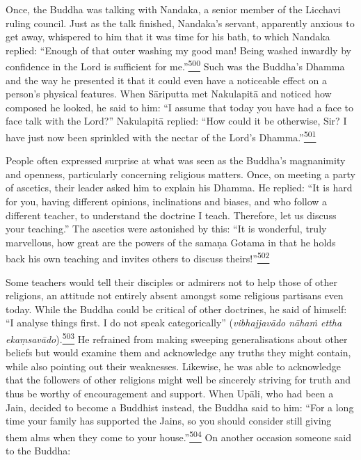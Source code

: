 Once, the Buddha was talking with Nandaka, a senior member of the
Licchavi ruling council. Just as the talk finished, Nandaka's servant,
apparently anxious to get away, whispered to him that it was time for
his bath, to which Nandaka replied: ``Enough of that outer washing my
good man! Being washed inwardly by confidence in the Lord is sufficient
for
me.''\label{footprints_split_013.html_fnref500}\hyperref[footprints_split_025.htmlux5cux23fn500]{\textsuperscript{500}}
Such was the Buddha's Dhamma and the way he presented it that it could
even have a noticeable effect on a person's physical features. When
Sāriputta met Nakulapitā and noticed how composed he looked, he said to
him: ``I assume that today you have had a face to face talk with the
Lord?'' Nakulapitā replied: ``How could it be otherwise, Sir? I have
just now been sprinkled with the nectar of the Lord's
Dhamma.''\label{footprints_split_013.html_fnref501}\hyperref[footprints_split_025.htmlux5cux23fn501]{\textsuperscript{501}}

People often expressed surprise at what was seen as the Buddha's
magnanimity and openness, particularly concerning religious matters.
Once, on meeting a party of ascetics, their leader asked him to explain
his Dhamma. He replied: ``It is hard for you, having different opinions,
inclinations and biases, and who follow a different teacher, to
understand the doctrine I teach. Therefore, let us discuss your
teaching.'' The ascetics were astonished by this: ``It is wonderful,
truly marvellous, how great are the powers of the samaṇa Gotama in that
he holds back his own teaching and invites others to discuss
theirs!''\label{footprints_split_013.html_fnref502}\hyperref[footprints_split_025.htmlux5cux23fn502]{\textsuperscript{502}}

Some teachers would tell their disciples or admirers not to help those
of other religions, an attitude not entirely absent amongst some
religious partisans even today. While the Buddha could be critical of
other doctrines, he said of himself: ``I analyse things first. I do not
speak categorically'' (\emph{vibhajjavādo nāhaṁ ettha}
\emph{ekaṃsavādo}).\label{footprints_split_013.html_fnref503}\hyperref[footprints_split_025.htmlux5cux23fn503]{\textsuperscript{503}}
He refrained from making sweeping generalisations about other beliefs
but would examine them and acknowledge any truths they might contain,
while also pointing out their weaknesses. Likewise, he was able to
acknowledge that the followers of other religions might well be
sincerely striving for truth and thus be worthy of encouragement and
support. When Upāli, who had been a Jain, decided to become a Buddhist
instead, the Buddha said to him: ``For a long time your family has
supported the Jains, so you should consider still giving them alms when
they come to your
house.''\label{footprints_split_013.html_fnref504}\hyperref[footprints_split_025.htmlux5cux23fn504]{\textsuperscript{504}}
On another occasion someone said to the Buddha:


